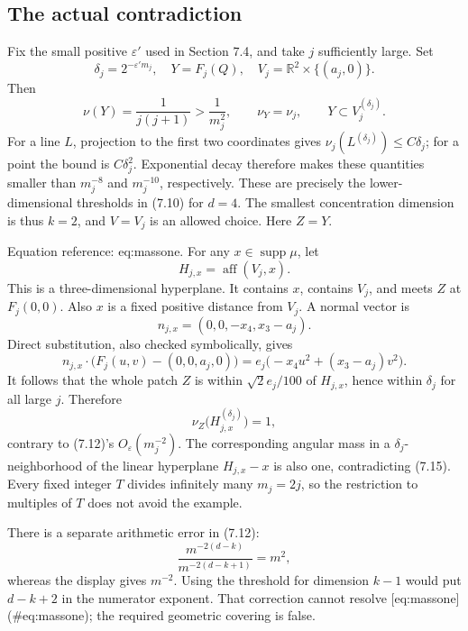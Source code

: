 \documentclass[10pt]{article}
\begin{document}
\subsection*{The actual contradiction}
Fix the small positive \(\varepsilon'\) used in Section 7.4, and take \(j\) sufficiently large. Set \[\delta_j=2^{-\varepsilon'm_j},\quad
 Y=F_j(Q),\quad
 V_j=\mathbb R^2\times\{(a_j,0)\}.\] Then \[\nu(Y)=\frac1{j(j+1)}>\frac1{m_j^2},\qquad
 \nu_Y=\nu_j,\qquad
 Y\subset V_j^{(\delta_j)}.\] For a line \(L\), projection to the first two coordinates gives \(\nu_j(L^{(\delta_j)})\le C\delta_j\); for a point the bound is \(C\delta_j^2\). Exponential decay therefore makes these quantities smaller than \(m_j^{-8}\) and \(m_j^{-10}\), respectively. These are precisely the lower-dimensional thresholds in (7.10) for \(d=4\). The smallest concentration dimension is thus \(k=2\), and \(V=V_j\) is an allowed choice. Here \(Z=Y\).\par
Equation reference: eq:massone. For any \(x\in\operatorname{supp}\mu\), let \[H_{j,x}=\operatorname{aff}(V_j,x).\] This is a three-dimensional hyperplane. It contains \(x\), contains \(V_j\), and meets \(Z\) at \(F_j(0,0)\). Also \(x\) is a fixed positive distance from \(V_j\). A normal vector is \[n_{j,x}=(0,0,-x_4,x_3-a_j).\] Direct substitution, also checked symbolically, gives \[n_{j,x}\cdot\bigl(F_j(u,v)-(0,0,a_j,0)\bigr)
 =e_j\bigl(-x_4u^2+(x_3-a_j)v^2\bigr).\] It follows that the whole patch \(Z\) is within \(\sqrt2 e_j/100\) of \(H_{j,x}\), hence within \(\delta_j\) for all large \(j\). Therefore \[
 \nu_Z\bigl(H_{j,x}^{(\delta_j)}\bigr)=1,\] contrary to (7.12)’s \(O_\varepsilon(m_j^{-2})\). The corresponding angular mass in a \(\delta_j\)-neighborhood of the linear hyperplane \(H_{j,x}-x\) is also one, contradicting (7.15). Every fixed integer \(T\) divides infinitely many \(m_j=2j\), so the restriction to multiples of \(T\) does not avoid the example.\par
There is a separate arithmetic error in (7.12): \[\frac{m^{-2(d-k)}}{m^{-2(d-k+1)}}=m^2,\] whereas the display gives \(m^{-2}\). Using the threshold for dimension \(k-1\) would put \(d-k+2\) in the numerator exponent. That correction cannot resolve [eq:massone] (\#eq:massone); the required geometric covering is false.\par
\end{document}
